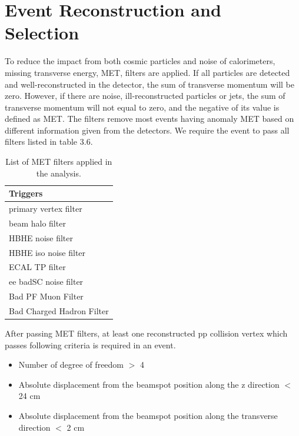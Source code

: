 \section{Event Reconstruction and Selection} \label{Event reconstruction and selection}
To reduce the impact from both cosmic particles and noise of calorimeters, missing transverse energy, MET, filters are applied.
If all particles are detected and well-reconstructed in the detector, the sum of transverse momentum will be zero. However, if there are noise, ill-reconstructed particles or jets, the sum of transverse momentum will not equal to zero, and the negative of its value is defined as MET.  
The filters remove most events having anomaly MET based on different information given from the detectors. We require the event to pass all filters listed in table 3.6\citep{MissingETOptionalFiltersRun2}.  %
\begin{table}[h!]
  \begin{center}
    \begin{tabular}{l}
    Triggers \\
    \hline
    primary vertex filter\\
    beam halo filter\\
    HBHE noise filter\\
    HBHE iso noise filter\\
    ECAL TP filter\\
    ee badSC noise filter\\
	Bad PF Muon Filter\\
	Bad Charged Hadron Filter\\ 
    \hline
    \end{tabular}
  \end{center}

  \caption{List of MET filters applied in the analysis.}
\end{table}

After passing MET filters, at least one reconstructed pp collision vertex which passes following criteria is required in an event.
\begin{itemize}[noitemsep]
\item Number of degree of freedom $>$ 4
\item Absolute displacement from the beamspot position along the z direction $<$ 24 cm
\item Absolute displacement from the beamspot position along the transverse direction $<$ 2 cm
\end{itemize}


